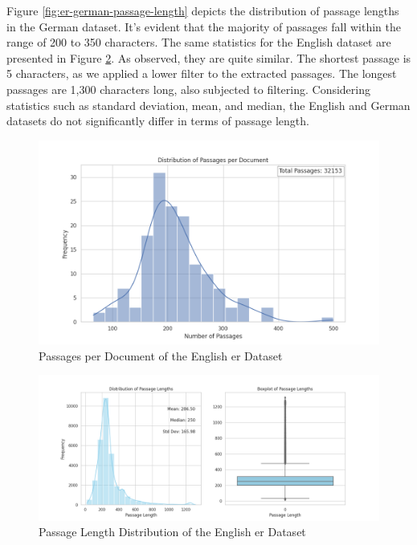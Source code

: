 Figure \ref{fig:er-german-passage-length} depicts the distribution of passage lengths in the German dataset. It's evident that the majority of passages fall within the range of 200 to 350 characters. The same statistics for the English dataset are presented in Figure \ref{fig:er-english-passage-length}. As observed, they are quite similar. The shortest passage is 5 characters, as we applied a lower filter to the extracted passages. The longest passages are 1,300 characters long, also subjected to filtering. Considering statistics such as standard deviation, mean, and median, the English and German datasets do not significantly differ in terms of passage length.


\begin{figure}
    \centering
    \includegraphics[width=\textwidth]{Grafiken/Statistiken/IndexEnglish_Passages_Distribution.png}
    \caption{Passages per Document of the English \gls{er} Dataset}
    \label{fig:er-english-passage-document}
\end{figure}

\begin{figure}
    \centering
    \includegraphics[width=\textwidth]{Grafiken/Statistiken/IndexEnglish_Passage_Length_Statistics.png}
    \caption{Passage Length Distribution of the English \gls{er} Dataset}
    \label{fig:er-english-passage-length}
\end{figure}


